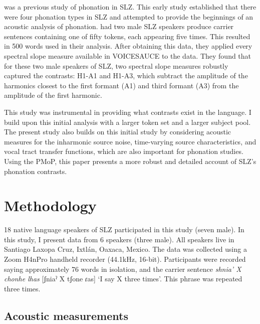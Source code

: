 \documentclass[12pt, letterpaper]{article}
\begin{document}
\citet{adlerAcousticsPhonationTypes2016} was a previous study of phonation in SLZ. This early study established that there were four phonation types in SLZ and attempted to provide the beginnings of an acoustic analysis of phonation. \citeauthor{adlerAcousticsPhonationTypes2016} had two male SLZ speakers produce carrier sentences containing one of fifty tokens, each appearing five times. This resulted in 500 words used in their analysis. After obtaining this data, they applied every spectral slope measure available in VOICESAUCE \citep{shueVOICESAUCEProgramVoice2009} to the data. They found that for these two male speakers of SLZ, two spectral slope measures robustly captured the contrasts: H1-A1 and H1-A3, which subtract the amplitude of the harmonics closest to the first formant (A1) and third formant (A3) from the amplitude of the first harmonic.

This study was instrumental in providing what contrasts exist in the language. I build upon this initial analysis with a larger token set and a larger subject pool. The present study also builds on this initial study by considering acoustic measures for the inharmonic source noise, time-varying source characteristics, and vocal tract transfer functions, which are also important for phonation studies. Using the PMoP, this paper presents a more robust and detailed account of SLZ's phonation contrasts.

\section{Methodology} \label{sec:Methods}

18 native language speakers of SLZ participated in this study (seven male). In this study, I present data from 6 speakers (three male). All speakers live in Santiago Laxopa Cruz, Ixtlán, Oaxaca, Mexico. The data was collected using a Zoom H4nPro handheld recorder (44.1kHz, 16-bit). Participants were recorded saying approximately 76 words in isolation, and the carrier sentence \textit{shnia' X chonhe lhas} [ʃniaˀ X tʃone ɾas] `I say X three times'. This phrase was repeated three times. 

\subsection{Acoustic measurements} \label{sec:Acoustics}
\end{document}

